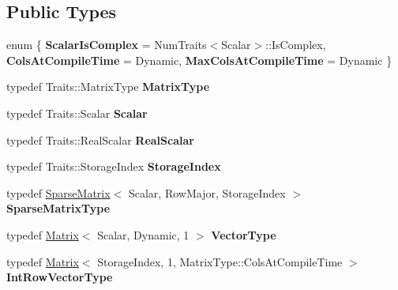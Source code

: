 \subsection*{Public Types}
\begin{DoxyCompactItemize}
\item 
\mbox{\label{class_eigen_1_1_pardiso_impl_ac9cf2bfe60203bbf9bcb402632bee1a4}} 
enum \{ {\bfseries Scalar\+Is\+Complex} = Num\+Traits$<$Scalar$>$\+::Is\+Complex, 
{\bfseries Cols\+At\+Compile\+Time} = Dynamic, 
{\bfseries Max\+Cols\+At\+Compile\+Time} = Dynamic
 \}
\item 
\mbox{\label{class_eigen_1_1_pardiso_impl_a2f2436d02c24adffa86fd417ce12b7c3}} 
typedef Traits\+::\+Matrix\+Type {\bfseries Matrix\+Type}
\item 
\mbox{\label{class_eigen_1_1_pardiso_impl_ae546657194f55140629bac75a8619769}} 
typedef Traits\+::\+Scalar {\bfseries Scalar}
\item 
\mbox{\label{class_eigen_1_1_pardiso_impl_a4a4dfb3a20c538cd373f4b62de9c5fed}} 
typedef Traits\+::\+Real\+Scalar {\bfseries Real\+Scalar}
\item 
\mbox{\label{class_eigen_1_1_pardiso_impl_a234a0c3536cccbeabcfe9ed8376a3691}} 
typedef Traits\+::\+Storage\+Index {\bfseries Storage\+Index}
\item 
\mbox{\label{class_eigen_1_1_pardiso_impl_a970eeb6d1193e63762adb8c7a06df581}} 
typedef \mbox{\hyperlink{class_eigen_1_1_sparse_matrix}{Sparse\+Matrix}}$<$ Scalar, Row\+Major, Storage\+Index $>$ {\bfseries Sparse\+Matrix\+Type}
\item 
\mbox{\label{class_eigen_1_1_pardiso_impl_a80b4f80cc8041abae10fe370172143fa}} 
typedef \mbox{\hyperlink{class_eigen_1_1_matrix}{Matrix}}$<$ Scalar, Dynamic, 1 $>$ {\bfseries Vector\+Type}
\item 
\mbox{\label{class_eigen_1_1_pardiso_impl_a90be930fec075f5fd78b9082f720d56b}} 
typedef \mbox{\hyperlink{class_eigen_1_1_matrix}{Matrix}}$<$ Storage\+Index, 1, Matrix\+Type\+::\+Cols\+At\+Compile\+Time $>$ {\bfseries Int\+Row\+Vector\+Type}

\end{DoxyCompactItemize}
